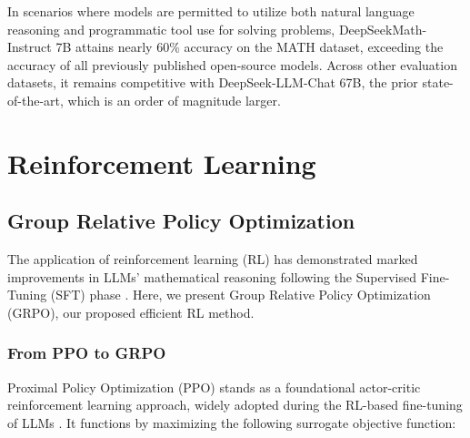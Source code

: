 In scenarios where models are permitted to utilize both natural language reasoning and programmatic tool use for solving problems, DeepSeekMath-Instruct 7B attains nearly 60\% accuracy on the MATH dataset, exceeding the accuracy of all previously published open-source models. Across other evaluation datasets, it remains competitive with DeepSeek-LLM-Chat 67B, the prior state-of-the-art, which is an order of magnitude larger.

\section{Reinforcement Learning}

\subsection{Group Relative Policy Optimization} The application of reinforcement learning (RL) has demonstrated marked improvements in LLMs’ mathematical reasoning following the Supervised Fine-Tuning (SFT) phase \citep{wang2023math,wizardmath}. Here, we present Group Relative Policy Optimization (GRPO), our proposed efficient RL method.

\subsubsection{From PPO to GRPO} Proximal Policy Optimization (PPO) \citep{schulman2017proximal} stands as a foundational actor-critic reinforcement learning approach, widely adopted during the RL-based fine-tuning of LLMs \citep{ouyang2022training}. It functions by maximizing the following surrogate objective function:

